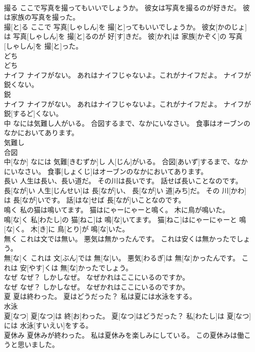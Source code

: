 \documentclass[8pt]{extreport}
\begin{document}
\begin{CJK}{UTF8}{min}
\\	撮る ここで写真を撮ってもいいでしょうか。 彼女は写真を撮るのが好きだ。 彼は家族の写真を撮った。	
\\	撮[と]る ここで 写真[しゃしん]を 撮[と]ってもいいでしょうか。 彼女[かのじょ]は 写真[しゃしん]を 撮[と]るのが 好[す]きだ。 彼[かれ]は 家族[かぞく]の 写真[しゃしん]を 撮[と]った。
\\	どち	
\\	どち
\\	ナイフ ナイフがない。 あれはナイフじゃないよ。これがナイフだよ。 ナイフが鋭くない。	
\\	鋭 
\\	ナイフ ナイフがない。 あれはナイフじゃないよ。これがナイフだよ。 ナイフが 鋭[するど]くない。
\\	中 なには気難し人がいる。 合図するまで、なかにいなさい。 食事はオーブンのなかにおいてあります。	
\\	気難し
\\	合図 
\\	中[なか] なには 気難[きむずか]し 人[じん]がいる。 合図[あいず]するまで、なかにいなさい。 食事[しょくじ]はオーブンのなかにおいてあります。
\\	長い 人生は長い、長い道だ。 その川は長いです。 話せば長いことなのです。	
\\	長[なが]い 人生[じんせい]は 長[なが]い、 長[なが]い 道[みち]だ。 その 川[かわ]は 長[なが]いです。 話[はな]せば 長[なが]いことなのです。
\\	鳴く 私の猫は鳴いてます。 猫はにゃーにゃーと鳴く。 木に鳥が鳴いた。	
\\	鳴[な]く 私[わたし]の 猫[ねこ]は 鳴[な]いてます。 猫[ねこ]はにゃーにゃーと 鳴[な]く。 木[き]に 鳥[とり]が 鳴[な]いた。
\\	無く これは文では無い。 悪気は無かったんです。 これは安くは無かったでしょう。	
\\	無[な]く これは 文[ぶん]では 無[な]い。 悪気[わるぎ]は 無[な]かったんです。 これは 安[やす]くは 無[な]かったでしょう。
\\	なぜ なぜ？ しかしなぜ。 なぜかれはここにいるのですか。	
\\	なぜ なぜ？ しかしなぜ。 なぜかれはここにいるのですか。
\\	夏 夏は終わった。 夏はどうだった？ 私は夏には水泳をする。	
\\	水泳 
\\	夏[なつ] 夏[なつ]は 終[お]わった。 夏[なつ]はどうだった？ 私[わたし]は 夏[なつ]には 水泳[すいえい]をする。
\\	夏休み 夏休みが終わった。 私は夏休みを楽しみにしている。 この夏休みは働こうと思いました。	

\end{CJK}
\end{document}
